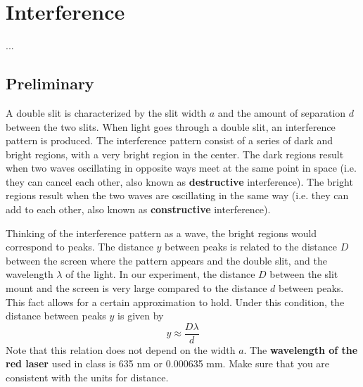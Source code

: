 \setcounter{chapter}{9}
\chapter{Interference}
...
\section{Preliminary}
A double slit is characterized by the slit width $a$ and the amount of separation $d$ between the two slits. When light goes through a double slit, an interference pattern is produced. The interference pattern consist of a series of dark and bright regions, with a very bright region in the center. The dark regions result when two waves oscillating in opposite ways meet at the same point in space (i.e. they can cancel each other, also known as \textbf{destructive} interference). The bright regions result when the two waves are oscillating in the same way (i.e. they can add to each other, also known as \textbf{constructive} interference).

Thinking of the interference pattern as a wave, the bright regions would correspond to peaks. The distance $y$ between peaks is related to the distance $D$ between the screen where the pattern appears and the double slit, and the wavelength $\lambda$ of the light. In our experiment, the distance $D$ between the slit mount and the screen is very large compared to the distance $d$ between peaks. This fact allows for a certain approximation to hold. Under this condition, the distance between peaks $y$ is given by
\begin{equation} \label{y.eq}
	y \approx \frac{D \lambda}{d}
\end{equation}
Note that this relation does not depend on the width $a$. The \textbf{wavelength of the red laser} used in class is 635 nm or 0.000635 mm. Make sure that you are consistent with the units for distance.
